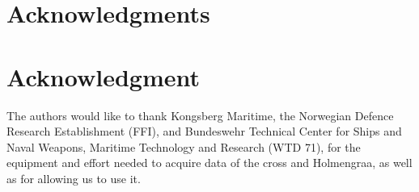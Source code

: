 \documentclass[10pt,journal,draftclsnofoot,onecolumn]{IEEEtran}
\newcommand\1{\vec 1}
\begin{document}
\ifCLASSOPTIONcompsoc
  \section*{Acknowledgments}
\else
  \section*{Acknowledgment}
\fi

The authors would like to thank Kongsberg Maritime, the Norwegian Defence Research Establishment (FFI), and Bundeswehr Technical Center for Ships and Naval Weapons, Maritime Technology and Research (WTD 71), for the equipment and effort needed to acquire data of the cross and Holmengraa, as well as for allowing us to use it.


\ifCLASSOPTIONcaptionsoff
  \newpage
\fi



% 
% 




\vfill 
\end{document}
